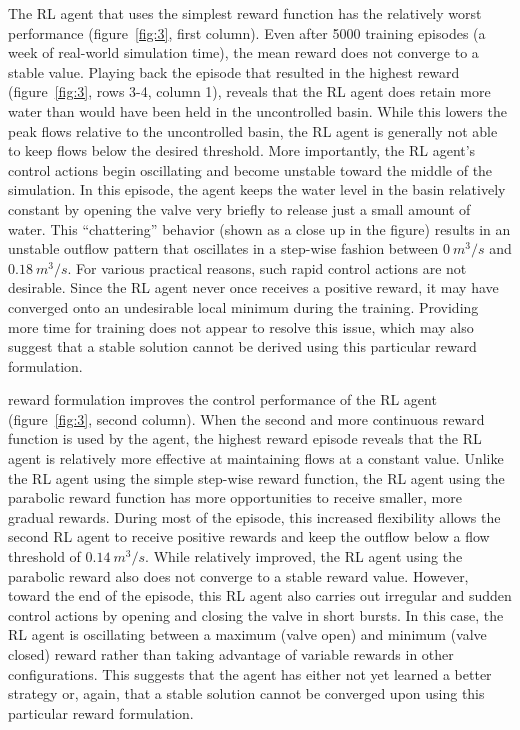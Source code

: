 The RL agent that uses the simplest reward function has the relatively worst performance (figure~\ref{fig:3}, first column).
Even after 5000 training episodes (a week of real-world simulation time), the mean reward does not converge to a stable value.
Playing back the episode that resulted in the highest reward (figure~\ref{fig:3}, rows 3-4, column 1), reveals that the RL agent does retain more water than would have been held in the uncontrolled basin.
While this lowers the peak flows relative to the uncontrolled basin, the RL agent is generally not able to keep flows below the desired threshold.
More importantly, the RL agent's control actions begin oscillating and become unstable toward the middle of the simulation.
In this episode, the agent keeps the water level in the basin relatively constant by opening the valve very briefly to release just a small amount of water.
This “chattering” behavior (shown as a close up in the figure) results in an unstable outflow pattern that oscillates in a step-wise fashion between $0\ m^3/s$ and $0.18\ m^3/s$.
For various practical reasons, such rapid control actions are not desirable.
Since the RL agent never once receives a positive reward, it may have converged onto an undesirable local minimum during the training.
Providing more time for training does not appear to resolve this issue, which may also suggest that a stable solution cannot be derived using this particular reward formulation.

  reward formulation improves the control performance of the RL agent (figure~\ref{fig:3}, second column).
When the second and more continuous reward function is used by the agent, the highest reward episode reveals that the RL agent is relatively more effective at maintaining flows at a constant value.
Unlike the RL agent using the simple step-wise reward function, the RL agent using the parabolic reward function has more opportunities to receive smaller, more gradual rewards.
During most of the episode, this increased flexibility allows the second RL agent to receive positive rewards and keep the outflow below a flow threshold of $0.14\ m^3/s$.
While relatively improved, the RL agent using the parabolic reward also does not converge to a stable reward value.
However, toward the end of the episode, this RL agent also carries out irregular and sudden control actions by opening and closing the valve in short bursts.
In this case, the RL agent is oscillating between a maximum (valve open) and minimum (valve closed) reward rather than taking advantage of variable rewards in other configurations.
This suggests that the agent has either not yet learned a better strategy or, again, that a stable solution cannot be converged upon using this particular reward formulation.

